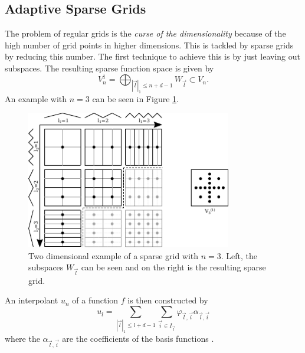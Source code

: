 \subsection{Adaptive Sparse Grids}
The problem of regular grids is the \textit{curse of the dimensionality} because of the high number of grid points in higher dimensions. This is tackled by sparse grids \cite{zenger1991sparse, bungartz2004sparse} by reducing this number. The first technique to achieve this is by just leaving out subspaces. The resulting sparse function space is given by 
\begin{equation}
	V_{n}^1 = \bigoplus_{\left|\vec{l}\right|_1 \le n+d-1 } W_{\vec{l}} \subset V_n.
\end{equation}
An example with $ n = 3 $ can be seen in Figure \ref{fig:sparse_grid}.
\begin{figure}[H]
	\centering
	\includegraphics[width=0.8\textwidth]{figures/Fig_2_9_two_dim_example}
	\caption{ Two dimensional example of a sparse grid with $ n = 3 $. Left, the subspaces $ W_{\vec{l}} $ can be seen and on the right is the resulting sparse grid. }
	\label{fig:sparse_grid}
\end{figure}

An interpolant $ u_n $ of a function $ f $ is then constructed by
\begin{equation}
	u_l = \sum_{ \left|\vec{l}\right|_1 \le l+d-1 } \sum_{ \vec{i} \in I_{\vec{l}} } \varphi_{\vec{l}, \vec{i}} \alpha_{\vec{l},\vec{i}}
\end{equation}
where the $ \alpha_{\vec{l},\vec{i}} $ are the coefficients of the basis functions \cite{obersteiner2022spatially}.

